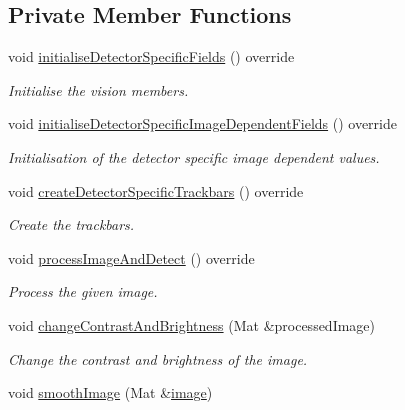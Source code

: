 \subsection*{Private Member Functions}
\begin{DoxyCompactItemize}
\item 
void \hyperlink{classmultiscale_1_1analysis_1_1RegionDetector_aee6bb117ea0ef98b8e333ac33d17962c}{initialise\-Detector\-Specific\-Fields} () override
\begin{DoxyCompactList}\small\item\em Initialise the vision members. \end{DoxyCompactList}\item 
void \hyperlink{classmultiscale_1_1analysis_1_1RegionDetector_afc8382c3838e476b0c7a5a9794ed42e5}{initialise\-Detector\-Specific\-Image\-Dependent\-Fields} () override
\begin{DoxyCompactList}\small\item\em Initialisation of the detector specific image dependent values. \end{DoxyCompactList}\item 
void \hyperlink{classmultiscale_1_1analysis_1_1RegionDetector_a904af350ef7e988bb10970cac7b9491a}{create\-Detector\-Specific\-Trackbars} () override
\begin{DoxyCompactList}\small\item\em Create the trackbars. \end{DoxyCompactList}\item 
void \hyperlink{classmultiscale_1_1analysis_1_1RegionDetector_ae47319444db34d72d4316f49f965b69d}{process\-Image\-And\-Detect} () override
\begin{DoxyCompactList}\small\item\em Process the given image. \end{DoxyCompactList}\item 
void \hyperlink{classmultiscale_1_1analysis_1_1RegionDetector_a92260dc64fb1de8f72df3a7bd44e171d}{change\-Contrast\-And\-Brightness} (Mat \&processed\-Image)
\begin{DoxyCompactList}\small\item\em Change the contrast and brightness of the image. \end{DoxyCompactList}\item 
void \hyperlink{classmultiscale_1_1analysis_1_1RegionDetector_a895f12ad46f2e0d1db45637a5935c2b5}{smooth\-Image} (Mat \&\hyperlink{classmultiscale_1_1analysis_1_1Detector_a523830a6cfe409694ce8327c3c736fbd}{image})

\end{DoxyCompactItemize}
